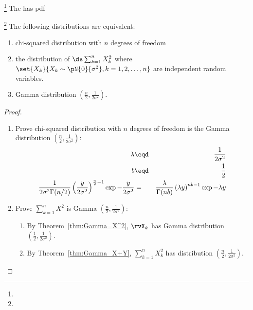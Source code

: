 \begin{definition}
\footnote{
  }
The  has pdf
\end{definition}

\begin{theorem}
\footnote{
  }
The following distributions are equivalent:
\begin{enumerate}
  \item chi-squared distribution with $n$ degrees of freedom
  \item the distribution of $\ds \sum_{k=1}^n X_k^2$ where
        $\set{X_k}{X_k\sim\pN{0}{\sigma^2}, k=1,2,\ldots,n}$
        are independent random variables.
  \item Gamma distribution $\left(\frac{n}{2}, \frac{1}{2\sigma^2} \right)$.
\end{enumerate}
\end{theorem}
\begin{proof}
\begin{enumerate}
\item Prove chi-squared distribution with $n$ degrees of freedom is the
      Gamma distribution $\left(\frac{n}{2}, \frac{1}{2\sigma^2} \right)$:
  \begin{eqnarray*}
    \lambda &\eqd& \frac{1}{2\sigma^2} \\
    b       &\eqd& \frac{1}{2} \\
    \frac{1}{2\sigma^2\Gamma(n/2)}
                 \left(\frac{y}{2\sigma^2}\right)^{\frac{n}{2}-1}
                 \exp{-\frac{y}{2\sigma^2}}
      &=& \frac{\lambda}{\Gamma(nb)}
          \left(\lambda y \right)^{nb-1}
          \exp{-\lambda y}
  \end{eqnarray*}

\item Prove $\sum_{k=1}^n X^2$ is Gamma $\left(\frac{n}{2}, \frac{1}{2\sigma^2} \right)$:
  \begin{enumerate}
    \item By Theorem~\ref{thm:Gamma=X^2}, $\rvX_k$ has Gamma distribution
          $\left(\frac{1}{2}, \frac{1}{2\sigma^2} \right)$.
    \item By Theorem~\ref{thm:Gamma_X+Y}, $\sum_{k=1}^n X_k^2$ has
          distribution $\left(\frac{n}{2}, \frac{1}{2\sigma^2} \right)$.
  \end{enumerate}
\end{enumerate}
\end{proof}

